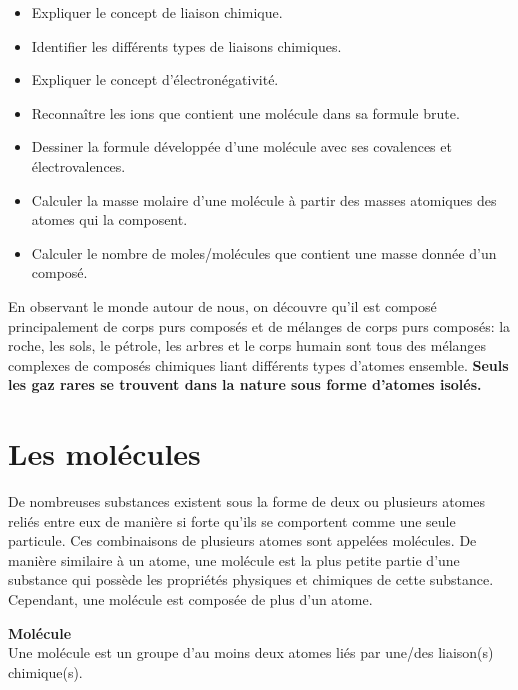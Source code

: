 \documentclass[
  11pt,
  a4paper,
  openany]{book}
\providecommand{\tightlist}{%
  \setlength{\itemsep}{0pt}\setlength{\parskip}{0pt}}
\begin{document}
\begin{objectives}

\begin{itemize}
\tightlist
\item
  Expliquer le concept de liaison chimique.
\item
  Identifier les différents types de liaisons chimiques.
\item
  Expliquer le concept d'électronégativité.
\item
  Reconnaître les ions que contient une molécule dans sa formule brute.
\item
  Dessiner la formule développée d'une molécule avec ses covalences et électrovalences.
\item
  Calculer la masse molaire d'une molécule à partir des masses atomiques des atomes qui la composent.
\item
  Calculer le nombre de moles/molécules que contient une masse donnée d'un composé.
\end{itemize}

\end{objectives}

En observant le monde autour de nous, on découvre qu'il est composé principalement de corps purs composés et de mélanges de corps purs composés: la roche, les sols, le pétrole, les arbres et le corps humain sont tous des mélanges complexes de composés chimiques liant différents types d'atomes ensemble. \textbf{Seuls les gaz rares se trouvent dans la nature sous forme d'atomes isolés.}

\section{Les molécules}\label{les-moluxe9cules}

De nombreuses substances existent sous la forme de deux ou plusieurs atomes reliés entre eux de manière si forte qu'ils se comportent comme une seule particule. Ces combinaisons de plusieurs atomes sont appelées molécules. De manière similaire à un atome, une molécule est la plus petite partie d'une substance qui possède les propriétés physiques et chimiques de cette substance. Cependant, une molécule est composée de plus d'un atome.

\begin{tcolorbox}
\textbf{Molécule}\\
Une molécule est un groupe d'au moins deux atomes liés par une/des liaison(s) chimique(s).

\end{tcolorbox}
\end{document}
